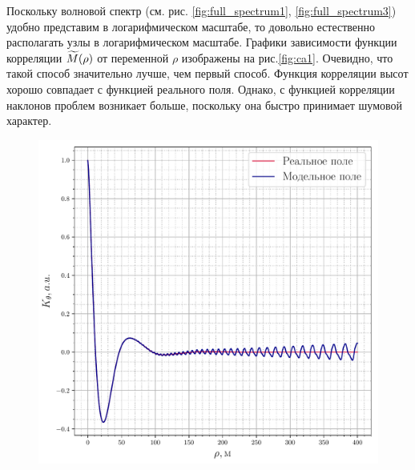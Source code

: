 Поскольку волновой спектр 
(см. рис. \ref{fig:full_spectrum1},
\ref{fig:full_spectrum3}) удобно представим в логарифмическом масштабе, то довольно естественно располагать узлы  в логарифмическом масштабе. Графики зависимости функции корреляции $\widetilde{M}(\rho)$ от переменной $\rho$ изображены на рис.\ref{fig:ca1}. Очевидно, что такой способ значительно лучше, чем первый способ. Функция корреляции высот хорошо совпадает с функцией реального поля. Однако, с функцией корреляции наклонов проблем возникает больше, поскольку она быстро принимает шумовой характер. 

\begin{figure}[h!]
	\begin{minipage}{0.49\linewidth}
			\centering
			\includegraphics[width=\linewidth]{fig/correlation_height_slopes1.pdf}
			\label{fig:ch1}		
	\end{minipage}
	\hfill
	\begin{minipage}{0.49\linewidth}
			\centering

\end{minipage}
\end{figure}

